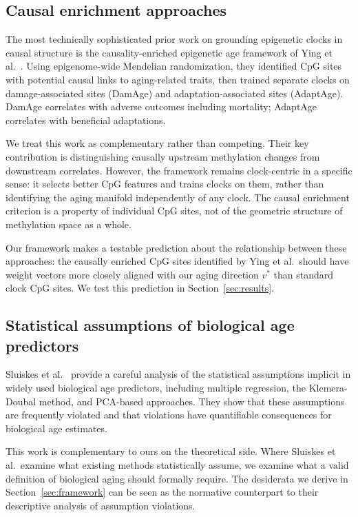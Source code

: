 \subsection{Causal enrichment approaches}

The most technically sophisticated prior work on grounding epigenetic clocks in
causal structure is the causality-enriched epigenetic age framework of Ying et al.\
\cite{ying2024}. Using epigenome-wide Mendelian randomization, they identified CpG
sites with potential causal links to aging-related traits, then trained separate
clocks on damage-associated sites (DamAge) and adaptation-associated sites (AdaptAge).
DamAge correlates with adverse outcomes including mortality; AdaptAge correlates with
beneficial adaptations.

We treat this work as complementary rather than competing. Their key contribution is
distinguishing causally upstream methylation changes from downstream correlates.
However, the framework remains clock-centric in a specific sense: it selects better
CpG features and trains clocks on them, rather than identifying the aging manifold
independently of any clock. The causal enrichment criterion is a property of
individual CpG sites, not of the geometric structure of methylation space as a whole.

Our framework makes a testable prediction about the relationship between these
approaches: the causally enriched CpG sites identified by Ying et al.\ should have
weight vectors more closely aligned with our aging direction $v^*$ than standard
clock CpG sites. We test this prediction in Section~\ref{sec:results}.

\subsection{Statistical assumptions of biological age predictors}

Sluiskes et al.\ \cite{sluiskes2024} provide a careful analysis of the statistical
assumptions implicit in widely used biological age predictors, including multiple
regression, the Klemera-Doubal method, and PCA-based approaches. They show that these
assumptions are frequently violated and that violations have quantifiable consequences
for biological age estimates.

This work is complementary to ours on the theoretical side. Where Sluiskes et al.\
examine what existing methods statistically assume, we examine what a valid definition
of biological aging should formally require. The desiderata we derive in
Section~\ref{sec:framework} can be seen as the normative counterpart to their
descriptive analysis of assumption violations.

